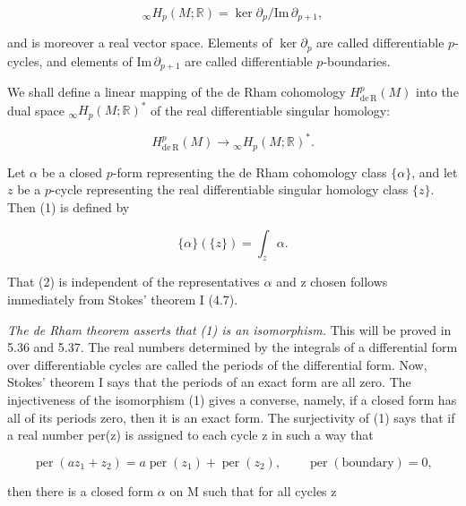 \begin{equation}
\tag{2}\label{eq:4.16:2}
{}_{\infty}H_{p}(M;\mathbb{R})=\ker\partial_{p}/\mathrm{Im}\,\partial_{p+1},
\end{equation}

and is moreover a real vector space. Elements of $\ker\partial_{p}$ are called differentiable $p$-cycles, and elements of $\mathrm{Im}\,\partial_{p+1}$ are called differentiable $p$-boundaries.

\label{thm:4.17}
We shall define a linear mapping of the de Rham cohomology  $ H_{\mathrm{de\,R}}^{p}(M) $ into the dual space ${}_{\infty}H_{p}(M;\mathbb{R})^{*}$ of the real differentiable singular homology:

\begin{equation}
\tag{1}\label{eq:4.17:1}
H_{\mathrm{de\,R}}^{p}(M)\to{}_{\infty}H_{p}(M;\mathbb{R})^{*}.
\end{equation}

Let $\alpha$ be a closed $p$-form representing the de Rham cohomology class $\{\alpha\}$, and let $z$ be a $p$-cycle representing the real differentiable singular homology class $\{z\}$. Then (1) is defined by

\begin{equation}
\tag{2}\label{eq:4.17:2}
\{\alpha\}(\{z\})=\int_{z}\alpha.
\end{equation}

That (2) is independent of the representatives  $ \alpha $ and z chosen follows immediately from Stokes' theorem I (4.7).

\emph{The de Rham theorem asserts that (1) is an isomorphism.} This will be proved in 5.36 and 5.37. The real numbers determined by the integrals of a differential form over differentiable cycles are called the periods of the differential form. Now, Stokes' theorem I says that the periods of an exact form are all zero. The injectiveness of the isomorphism (1) gives a converse, namely, if a closed form has all of its periods zero, then it is an exact form. The surjectivity of (1) says that if a real number per(z) is assigned to each cycle z in such a way that

\begin{equation}
\tag{3}\label{eq:4.17:3}
\operatorname{per}(az_{1}+z_{2})=a\operatorname{per}(z_{1})+\operatorname{per}(z_{2}),\qquad\operatorname{per}(\mathrm{boundary})=0,
\end{equation}

then there is a closed form  $ \alpha $ on M such that for all cycles z

